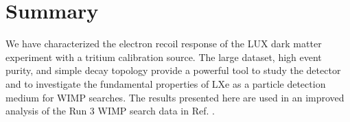 \section{Summary}

We have characterized the electron recoil response of the LUX dark matter experiment with a tritium calibration source. The large dataset, high event purity, and simple decay topology provide a powerful tool to study the detector and to investigate the fundamental properties of LXe as a particle detection medium for WIMP searches. The results presented here are used in an improved analysis of the Run 3 WIMP search data in Ref. \cite{lux-reanalysis}.